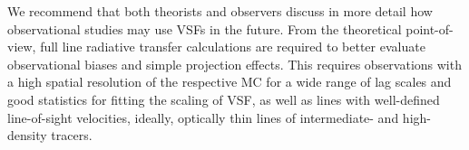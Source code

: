 We recommend that both theorists and observers discuss in more detail how observational studies may use VSFs in the future.
From the theoretical point-of-view, full line radiative transfer calculations are required to better evaluate observational biases and simple projection effects.
This requires observations with a high spatial resolution of the respective MC for a wide range of lag scales and good statistics for fitting the scaling of VSF, as well as lines with well-defined line-of-sight velocities, ideally, optically thin lines of intermediate- and high-density tracers. 









\endinput
